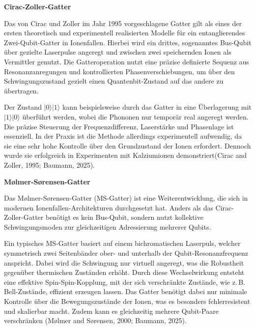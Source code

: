 \newpage
\textbf{Cirac-Zoller-Gatter} 

Das von Cirac und Zoller im Jahr 1995 vorgeschlagene Gatter gilt als eines der ersten theoretisch und experimentell realisierten Modelle für ein entanglierendes Zwei-Qubit-Gatter in Ionenfallen. Hierbei wird ein drittes, sogenanntes Bus-Qubit über gezielte Laserpulse angeregt und zwischen zwei speichernden Ionen als Vermittler genutzt. Die Gatteroperation nutzt eine präzise definierte Sequenz aus Resonanzanregungen und kontrollierten Phasenverschiebungen, um über den Schwingungszustand gezielt einen Quantenbit-Zustand auf das andere zu übertragen.

Der Zustand \( \lvert 0 \rangle \lvert 1 \rangle \) kann beispielsweise durch das Gatter in eine Überlagerung mit \( \lvert 1 \rangle \lvert 0 \rangle \) überführt werden, wobei die Phononen nur temporär real angeregt werden. Die präzise Steuerung der Frequenzdifferenz, Laserstärke und Phasenlage ist essenziell. In der Praxis ist die Methode allerdings experimentell aufwendig, da sie eine sehr hohe Kontrolle über den Grundzustand der Ionen erfordert. Dennoch wurde sie erfolgreich in Experimenten mit Kalziumionen demonstriert(Cirac and Zoller, 1995; Baumann, 2025). 

\textbf{Mølmer-Sørensen-Gatter} 


Das Mølmer-Sørensen-Gatter (MS-Gatter) ist eine Weiterentwicklung, die sich in modernen Ionenfallen-Architekturen durchgesetzt hat. Anders als das Cirac-Zoller-Gatter benötigt es kein Bus-Qubit, sondern nutzt kollektive Schwingungsmoden zur gleichzeitigen Adressierung mehrerer Qubits.

Ein typisches MS-Gatter basiert auf einem bichromatischen Laserpuls, welcher symmetrisch zwei Seitenbänder ober- und unterhalb der Qubit-Resonanzfrequenz anspricht. Dabei wird die Schwingung nur virtuell angeregt, was die Robustheit gegenüber thermischen Zuständen erhöht. Durch diese Wechselwirkung entsteht eine effektive Spin-Spin-Kopplung, mit der sich verschränkte Zustände, wie z.\,B. Bell-Zustände, effizient erzeugen lassen. Das Gatter benötigt dabei nur minimale Kontrolle über die Bewegungszustände der Ionen, was es besonders fehlerresistent und skalierbar macht. Zudem kann es gleichzeitig mehrere Qubit-Paare verschränken (Mølmer and Sørensen, 2000; Baumann, 2025).

